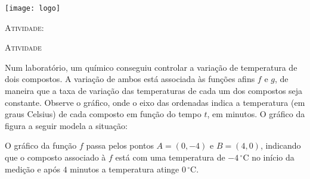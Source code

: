 \documentclass[10 pt,usenames,dvipsnames, oneside]{article}
\begin{document}
\begin{center}
  \begin{minipage}[l]{3cm}
\texttt{[image: logo]}    
\end{minipage}\hfill
\begin{minipage}[r]{.8\textwidth}
 {\Large \scshape Atividade: }  
\end{minipage}
\end{center}
\vspace{.2cm}

\ifdefined\prof
\begin{objetivos}
\item \phantom{a}
\end{objetivos}



\bigskip
\begin{center}
{\large \scshape Atividade}
\end{center}
\fi

Num laboratório, um químico conseguiu controlar a variação de temperatura de dois compostos. A variação de ambos está associada às funções afins \(f\) e \(g\), de maneira que a taxa de variação das temperaturas de cada um dos compostos seja constante. Observe o gráfico, onde o eixo das ordenadas indica a temperatura (em graus Celsius) de cada composto em função do tempo \(t\), em minutos. O gráfico da figura a seguir modela a situação:

\begin{figure}[H]
\centering

\end{figure}


O gráfico da função \(f\) passa pelos pontos \(A=(0,-4)\) e \(B=(4,0)\), indicando que o composto associado à \(f\) está com uma temperatura de \(-4\,^{\circ}\mathrm{C}\) no início da medição e após \(4\) minutos a temperatura atinge \(0\,^{\circ}\mathrm{C}\).
\end{document}

